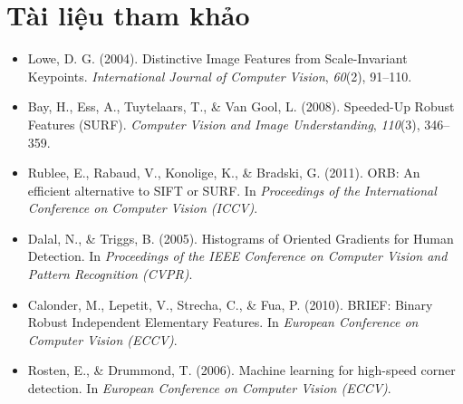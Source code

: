 \section*{Tài liệu tham khảo}
\begin{itemize}
    \item[1] Lowe, D. G. (2004). Distinctive Image Features from Scale-Invariant Keypoints. \textit{International Journal of Computer Vision}, \textit{60}(2), 91–110.
    \item[2] Bay, H., Ess, A., Tuytelaars, T., \& Van Gool, L. (2008). Speeded-Up Robust Features (SURF). \textit{Computer Vision and Image Understanding}, \textit{110}(3), 346–359.
    \item[3] Rublee, E., Rabaud, V., Konolige, K., \& Bradski, G. (2011). ORB: An efficient alternative to SIFT or SURF. In \textit{Proceedings of the International Conference on Computer Vision (ICCV)}.
    \item[4] Dalal, N., \& Triggs, B. (2005). Histograms of Oriented Gradients for Human Detection. In \textit{Proceedings of the IEEE Conference on Computer Vision and Pattern Recognition (CVPR)}.
    \item[5] Calonder, M., Lepetit, V., Strecha, C., \& Fua, P. (2010). BRIEF: Binary Robust Independent Elementary Features. In \textit{European Conference on Computer Vision (ECCV)}.
    \item[6] Rosten, E., \& Drummond, T. (2006). Machine learning for high-speed corner detection. In \textit{European Conference on Computer Vision (ECCV)}.
\end{itemize}